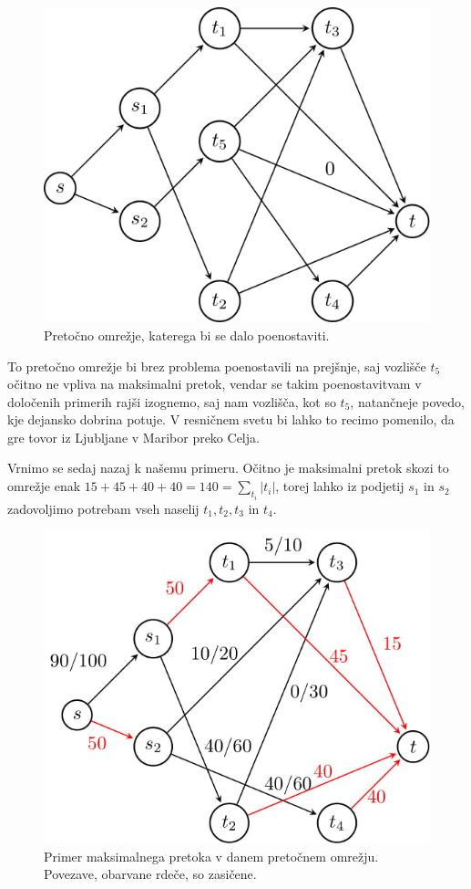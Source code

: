 \documentclass[mat1]{fmfdelo}
\begin{document}
\begin{figure}[H]
  \centering
  \includegraphics[scale=.358]{images/primer1-2/primer1-2-1.jpg}
  \caption{Pretočno omrežje, katerega bi se dalo poenostaviti.}
\end{figure}

To pretočno omrežje bi brez problema poenostavili na prejšnje, saj vozlišče $t_5$ očitno ne vpliva na maksimalni pretok, vendar se takim poenostavitvam v določenih primerih
rajši izognemo, saj nam vozlišča, kot so $t_5$, natančneje povedo, kje dejansko dobrina potuje. V resničnem svetu bi lahko to recimo pomenilo, da gre tovor iz Ljubljane
v Maribor preko Celja.

Vrnimo se sedaj nazaj k našemu primeru. Očitno je maksimalni pretok skozi to omrežje enak $15 + 45 + 40 + 40 = 140 = \sum_{t_i} |t_i|$, torej lahko iz podjetij $s_1$ in $s_2$
zadovoljimo potrebam vseh naselij $t_1, t_2, t_3$ in $t_4$.

\begin{figure}[H]
  \centering
  \includegraphics[scale=.358]{images/primer1-3/primer1-3-1.jpg}
  \caption{Primer maksimalnega pretoka v danem pretočnem omrežju. Povezave, obarvane rdeče, so zasičene.}
\end{figure}
\end{document}
